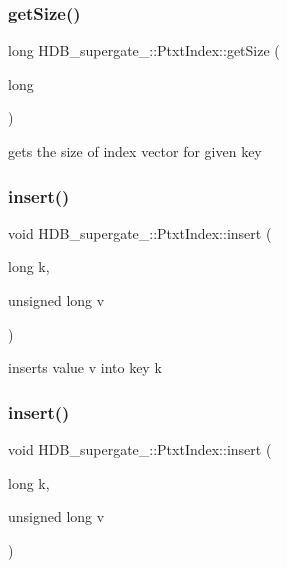 \subsubsection{\texorpdfstring{get\+Size()}{getSize()}\hspace{0.1cm}{\footnotesize\ttfamily [2/2]}}
{\footnotesize\ttfamily long H\+D\+B\+\_\+supergate\+\_\+\+::\+Ptxt\+Index\+::get\+Size (\begin{DoxyParamCaption}\item[{long}]{ }\end{DoxyParamCaption})}

gets the size of index vector for given key \mbox{\label{classHDB__supergate___1_1PtxtIndex_ab20a8fdd29fcbb48772689399929bbdb}} 
\subsubsection{\texorpdfstring{insert()}{insert()}\hspace{0.1cm}{\footnotesize\ttfamily [1/2]}}
{\footnotesize\ttfamily void H\+D\+B\+\_\+supergate\+\_\+\+::\+Ptxt\+Index\+::insert (\begin{DoxyParamCaption}\item[{long}]{k,  }\item[{unsigned long}]{v }\end{DoxyParamCaption})}

inserts value v into key k \mbox{\label{classHDB__supergate___1_1PtxtIndex_ab20a8fdd29fcbb48772689399929bbdb}} 
\subsubsection{\texorpdfstring{insert()}{insert()}\hspace{0.1cm}{\footnotesize\ttfamily [2/2]}}
{\footnotesize\ttfamily void H\+D\+B\+\_\+supergate\+\_\+\+::\+Ptxt\+Index\+::insert (\begin{DoxyParamCaption}\item[{long}]{k,  }\item[{unsigned long}]{v }\end{DoxyParamCaption})}

